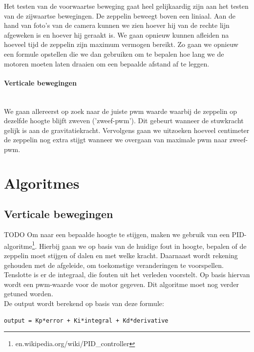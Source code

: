 \documentclass[eind]{penoverslag}
\begin{document}
Het testen van de voorwaartse beweging gaat heel gelijkaardig zijn aan het testen van de zijwaartse bewegingen.  De zeppelin beweegt boven een liniaal.  Aan de hand van foto's van de camera kunnen we zien hoever hij van de rechte lijn afgeweken is en hoever hij geraakt is. We gaan opnieuw kunnen afleiden na hoeveel tijd de zeppelin zijn maximum vermogen bereikt. Zo gaan we opnieuw een formule opstellen die we dan gebruiken om te bepalen hoe lang we de motoren moeten laten draaien om een bepaalde afstand af te leggen. \\

\paragraph{Verticale bewegingen} ~\\ 
We gaan allereerst op zoek naar de juiste pwm waarde waarbij de zeppelin op dezelfde hoogte blijft zweven ('zweef-pwm').  Dit gebeurt wanneer de stuwkracht gelijk is aan de gravitatiekracht.  Vervolgens gaan we uitzoeken hoeveel centimeter de zeppelin nog extra stijgt wanneer we overgaan van maximale pwm naar zweef-pwm.\\



\section{Algoritmes}
\subsection{Verticale bewegingen}
TODO
Om naar een bepaalde hoogte te stijgen, maken we gebruik van een PID-algoritme\footnote{en.wikipedia.org/wiki/PID\_controller}. Hierbij gaan we op basis van de huidige fout in hoogte, bepalen of de zeppelin moet stijgen of dalen en met welke kracht. Daarnaast wordt rekening gehouden met de afgeleide, om toekomstige veranderingen te voorspellen. Tenslotte is er de integraal, die fouten uit het verleden voorstelt. Op basis hiervan wordt een pwm-waarde voor de motor gegeven. Dit algoritme moet nog verder getuned worden. \\
De output wordt berekend op basis van deze formule: 

\begin{center}
\texttt{output = Kp*error + Ki*integral + Kd*derivative}\\
\end{center}
\end{document}

